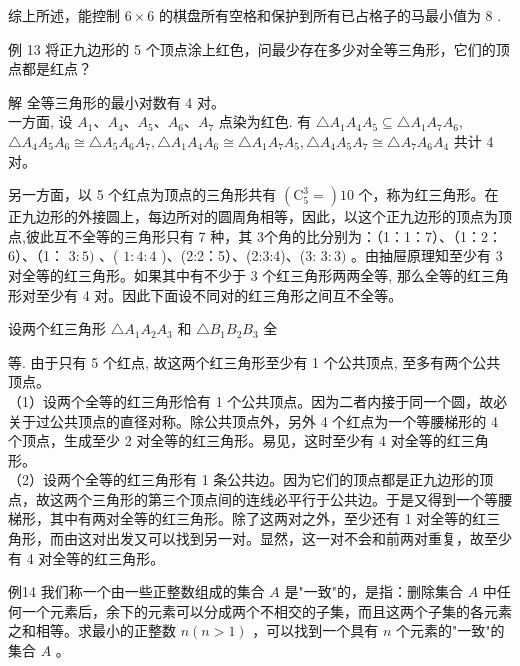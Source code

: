 \documentclass[10pt]{article}
\begin{document}
综上所述，能控制 $6 \times 6$ 的棋盘所有空格和保护到所有已占格子的马最小值为 8 .

例 13 将正九边形的 5 个顶点涂上红色，问最少存在多少对全等三角形，它们的顶点都是红点？

解 全等三角形的最小对数有 4 对。\\
一方面, 设 $A_{1} 、 A_{4} 、 A_{5} 、 A_{6} 、 A_{7}$ 点染为红色. 有 $\triangle A_{1} A_{4} A_{5} \subseteq \triangle A_{1} A_{7} A_{6}$, $\triangle A_{4} A_{5} A_{6} \cong \triangle A_{5} A_{6} A_{7}, \triangle A_{1} A_{4} A_{6} \cong \triangle A_{1} A_{7} A_{5}, \triangle A_{4} A_{5} A_{7} \cong \triangle A_{7} A_{6} A_{4}$ 共计 4 对。

另一方面，以 5 个红点为顶点的三角形共有 $\left(\mathrm{C}_{5}^{3}=\right) 10$ 个，称为红三角形。在正九边形的外接圆上，每边所对的圆周角相等，因此，以这个正九边形的顶点为顶点,彼此互不全等的三角形只有 7 种，其 3个角的比分别为：（1：1：7）、（1：2：6）、（1： $3: 5)$ 、( $1: 4: 4$ )、(2:2：5）、(2:3:4)、(3: $3: 3)$ 。由抽屉原理知至少有 3 对全等的红三角形。如果其中有不少于 3 个红三角形两两全等, 那么全等的红三角形对至少有 4 对。因此下面设不同对的红三角形之间互不全等。

设两个红三角形 $\triangle A_{1} A_{2} A_{3}$ 和 $\triangle B_{1} B_{2} B_{3}$ 全

等. 由于只有 5 个红点, 故这两个红三角形至少有 1 个公共顶点, 至多有两个公共顶点。\\
（1）设两个全等的红三角形恰有 1 个公共顶点。因为二者内接于同一个圆，故必关于过公共顶点的直径对称。除公共顶点外，另外 4 个红点为一个等腰梯形的 4 个顶点，生成至少 2 对全等的红三角形。易见，这时至少有 4 对全等的红三角形。\\
（2）设两个全等的红三角形有 1 条公共边。因为它们的顶点都是正九边形的顶点，故这两个三角形的第三个顶点间的连线必平行于公共边。于是又得到一个等腰梯形，其中有两对全等的红三角形。除了这两对之外，至少还有 1 对全等的红三角形，而由这对出发又可以找到另一对。显然，这一对不会和前两对重复，故至少有 4 对全等的红三角形。

例14 我们称一个由一些正整数组成的集合 $A$ 是"一致"的，是指：删除集合 $A$ 中任何一个元素后，余下的元素可以分成两个不相交的子集，而且这两个子集的各元素之和相等。求最小的正整数 $n(n>1)$ ，可以找到一个具有 $n$ 个元素的"一致"的集合 $A$ 。
\end{document}
